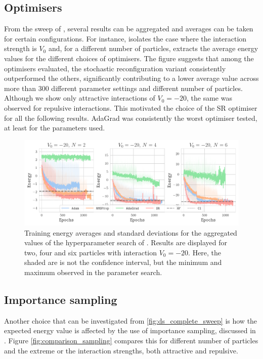 \subsection{Optimisers}
From the sweep of , several results can be aggregated and averages can be taken for certain configurations. For instance,  isolates the case where the interaction strength is $V_0$ and, for a different number of particles, extracts the average energy values for the different choices of optimisers. The figure suggests that among the optimisers evaluated, the stochastic reconfiguration variant consistently outperformed the others, significantly contributing to a lower average value across more than 300 different parameter settings and different number of particles. Although we show only attractive interactions of $V_0 = -20$, the same was observed for repulsive interactions. This motivated the choice of the SR optimiser for all the following results. AdaGrad was consistently the worst optimiser tested, at least for the parameters used.

\begin{figure}[H]
    \centering
    \includegraphics[width=1\linewidth]{Chapters/Results/N2/opti_sweepv0-20.pdf}
    \caption{Training energy averages and standard deviations for the aggregated values of the hyperparameter search of . Results are displayed for two, four and six particles with interaction $V_0=-20$. Here, the shaded are is not the confidence interval, but the minimum and maximum observed in the parameter search.}
    \label{fig:N2V0=-20_OPT}
\end{figure}

\subsection{Importance sampling}

Another choice that can be investigated from \ref{fig:ds_complete_sweep} is how the expected energy value is affected by the use of importance sampling, discussed in . Figure \ref{fig:comparison_sampling} compares this for different number of particles and the extreme or the interaction strengths, both attractive and repulsive.


